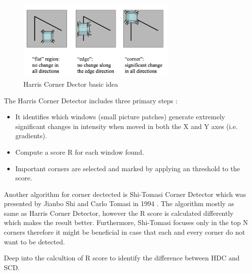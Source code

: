 \documentclass[a4paper, 12pt]{article}
\begin{document}
\begin{figure}[H]
    \centering
    \includegraphics[width=0.7\textwidth]{Basic idea of Harris Corner Detector.png}
    \caption{Harris Corner Dector basic idea}
    \label{Figure X}
\end{figure}

The Harris Corner Detector includes three primary steps \citep{ryu2011formula}:

\begin{itemize}
    \item It identifies which windows (small picture patches) generate extremely significant changes in intensity when moved in both the X and Y axes (i.e. gradients).
    \item Compute a score R for each window found.
    \item Important corners are selected and marked by applying an threshold to the score.
\end{itemize}

Another algorithm for corner dectected is Shi-Tomasi Corner Detector which was presented by Jianbo Shi and Carlo Tomasi in 1994 \citep{shi1994good}. The algorithm mostly as same as Harris Corner Detector, however the R score is calculated differently which makes the result better. Furthermore, Shi-Tomasi focuses only in the top N corners therefore it might be beneficial in case that each and every corner do not want to be detected.

Deep into the calcultion of R score to identify the difference between HDC and SCD.

\begin{table}[ht!]
    \centering
    \def\arraystretch{1}%
    \caption{HDC vs SDC Scoring function}
    \label{table:1}
\end{table}
\end{document}
